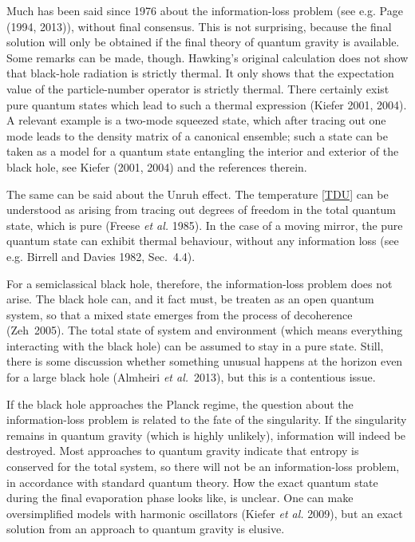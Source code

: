 \documentclass[12pt,a4paper]{article}
\begin{document}
Much has been said since 1976 about the information-loss problem
(see e.g. Page (1994, 2013)), without final consensus. This is not
surprising, because the final solution will only be obtained if the
final theory of quantum gravity is available. Some remarks can 
be made, though. Hawking's original calculation does not show that
black-hole radiation is strictly thermal. It only shows that the expectation
value of the particle-number operator is strictly thermal. There certainly exist
pure quantum states which lead to such a thermal expression (Kiefer
2001, 2004). A relevant example is a two-mode squeezed state, which
after tracing out one mode leads to the density matrix of a canonical
ensemble; such a state can be taken as a model for a quantum state
entangling the interior and exterior of the black hole, see Kiefer
(2001, 2004) and the references therein. 

The same can be said about the Unruh effect. The temperature
\eqref{TDU} can be understood as arising from tracing out degrees of
freedom in the total quantum state, which is pure (Freese {\em et al.}
1985). In the case of a moving mirror, the pure quantum state can
exhibit thermal behaviour, without any information loss (see
e.g. Birrell and Davies 1982, Sec.~4.4). 

For a semiclassical black hole, therefore, the information-loss
problem does not arise. The black hole can, and it fact must, be
treaten as an open quantum system, so that a mixed state emerges from
the process of decoherence (Zeh~2005). The total state of system and
environment (which means everything interacting with the black hole)
can be assumed to stay in a pure state.  Still, there is some
discussion whether something unusual happens at the horizon even for a
large black hole (Almheiri {\em et al.}~2013), but this is a
contentious issue. 

If the black hole approaches the Planck regime, the question about the
information-loss problem is related to the fate of the singularity. 
If the singularity remains in quantum gravity (which is highly
unlikely), information will indeed be destroyed. Most approaches to
quantum gravity indicate that entropy is conserved for the total
system, so there will not be an information-loss problem, in
accordance with standard quantum theory. How the exact quantum state
during the final evaporation phase looks like, is unclear. One can
make oversimplified models with harmonic oscillators (Kiefer {\em et
  al.} 2009), but an exact solution from an approach to quantum
gravity is elusive. 
\end{document}
